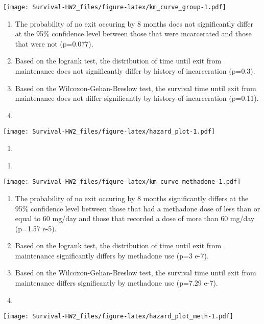\documentclass[
]{article}
\begin{document}
\texttt{[image: Survival-HW2\_files/figure-latex/km\_curve\_group-1.pdf]}

\begin{enumerate}
\def\labelenumi{\roman{enumi}.}
\setcounter{enumi}{1}
\item
  The probability of no exit occuring by 8 months does not significantly
  differ at the 95\% confidence level between those that were
  incarcerated and those that were not (p=0.077).
\item
  Based on the logrank test, the distribution of time until exit from
  maintenance does not significantly differ by history of incarceration
  (p=0.3).
\item
  Based on the Wilcoxon-Gehan-Breslow test, the survival time until exit
  from maintenance does not differ significantly by history of
  incarceration (p=0.11).
\item
\end{enumerate}

\texttt{[image: Survival-HW2\_files/figure-latex/hazard\_plot-1.pdf]}

\begin{enumerate}
\def\labelenumi{(\alph{enumi})}
\setcounter{enumi}{3}
\item
\end{enumerate}

\begin{enumerate}
\def\labelenumi{\roman{enumi}.}
\item
\end{enumerate}

\texttt{[image: Survival-HW2\_files/figure-latex/km\_curve\_methadone-1.pdf]}

\begin{enumerate}
\def\labelenumi{\roman{enumi}.}
\setcounter{enumi}{1}
\item
  The probability of no exit occuring by 8 months significantly differs
  at the 95\% confidence level between those that had a methadone dose
  of less than or equal to 60 mg/day and those that recorded a dose of
  more than 60 mg/day (p=1.57 e-5).
\item
  Based on the logrank test, the distribution of time until exit from
  maintenance significantly differs by methadone use (p=3 e-7).
\item
  Based on the Wilcoxon-Gehan-Breslow test, the survival time until exit
  from maintenance differs significantly by methadone use (p=7.29 e-7).
\item
\end{enumerate}

\texttt{[image: Survival-HW2\_files/figure-latex/hazard\_plot\_meth-1.pdf]}
\end{document}
